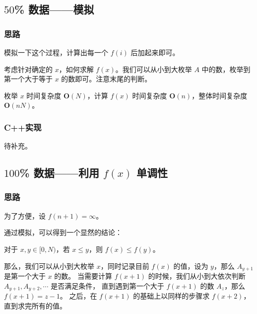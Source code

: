 
% 

\subsection{$50$\% 数据——模拟}

\subsubsection{思路}

模拟一下这个过程，计算出每一个 $f(i)$ 后加起来即可。

考虑针对确定的 $x$，如何求解 $f(x)$。我们可以从小到大枚举 $A$ 中的数，枚举到第一个大于等于 $x$ 的数即可。注意末尾的判断。

枚举 $x$ 时间复杂度 $\mathbf{O}(N)$，计算 $f(x)$ 时间复杂度 $\mathbf{O}(n)$，整体时间复杂度 $\mathbf{O}(nN)$。

\subsubsection{C++实现}

待补充。

\subsection{$100$\% 数据——利用 $f(x)$ 单调性}

\subsubsection{思路}

为了方便，设 $f(n+1) = \infty$。

通过模拟，可以得到一个显然的结论：

\begin{theorem}[$f(x)$的单调性] \label{thm:fx_monotonicity} 
  对于 $x,y\in [0,N)$，若 $x \le y$，则 $f(x) \le f(y)$。
\end{theorem}

那么，我们可以从小到大枚举 $x$，同时记录目前 $f(x)$ 的值，设为 $y$，那么 $A_{y+1}$ 是第一个大于 $x$ 的数。
当需要计算 $f(x+1)$ 的时候，我们从小到大依次判断 $A_{y+1},A_{y+2},\cdots$ 是否满足条件，
直到遇到第一个大于 $f(x+1)$ 的数 $A_z$，那么 $f(x+1)=z-1$。
之后，在 $f(x+1)$ 的基础上以同样的步骤求 $f(x+2)$，直到求完所有的值。

